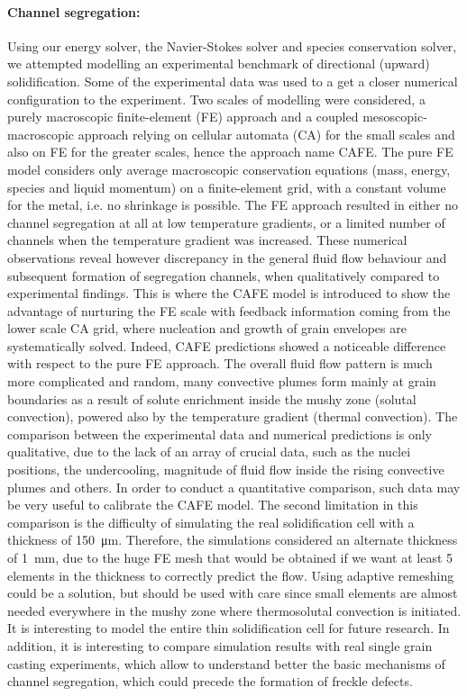 \paragraph{Channel segregation:}
Using our energy solver, the Navier-Stokes solver and species conservation solver, we attempted modelling an experimental benchmark 
of directional (upward)  solidification. Some of the experimental data was used to a get a closer numerical configuration to the experiment.
Two scales of modelling were considered, a purely macroscopic finite-element (FE) approach and a coupled mesoscopic-macroscopic approach
relying on cellular automata (CA) for the small scales and also on FE for the greater scales, hence the approach name CAFE. 
The pure FE model considers only average macroscopic conservation equations (mass, energy, species and liquid momentum) 
on a finite-element grid, with a constant volume for the metal, i.e. no shrinkage is possible. 
The FE approach resulted in either no channel segregation at all at low temperature gradients, or a limited number of channels when
the temperature gradient was increased. These numerical observations reveal however discrepancy in the general fluid flow behaviour and 
subsequent formation of segregation channels, when qualitatively compared to experimental findings.
This is where the CAFE model is introduced to show the advantage of nurturing the FE scale with feedback information coming from
the lower scale CA grid, where nucleation and growth of grain envelopes are systematically solved.
Indeed, CAFE predictions showed a noticeable difference with respect to the pure FE approach. The overall fluid flow pattern is 
much more complicated and random, many convective plumes form mainly at grain boundaries as a result of solute enrichment inside the mushy zone (solutal convection),
powered also by the temperature gradient (thermal convection).   
The comparison between the experimental data and numerical predictions is only qualitative, due to the lack of an array of crucial data, such 
as the nuclei positions, the undercooling, magnitude of fluid flow inside the rising convective plumes and others.
In order to conduct a quantitative comparison, such data may be very useful to calibrate the CAFE model.
The second limitation in this comparison is the difficulty of simulating the real solidification cell with a thickness of \SI{150}{\micro \metre}.
Therefore, the simulations considered an alternate thickness of \SI{1}{\milli \metre}, due to the huge FE mesh that would be obtained if
we want at least 5 elements in the thickness to correctly predict the flow. Using adaptive remeshing could be a solution, but should be used
with care since small elements are almost needed everywhere in the mushy zone where thermosolutal convection is initiated.   
It is interesting to model the entire thin solidification cell for future research. In addition, it is interesting to compare simulation
results with real single grain casting experiments, which allow to understand better the basic mechanisms of channel segregation, which
could precede the formation of freckle defects.

